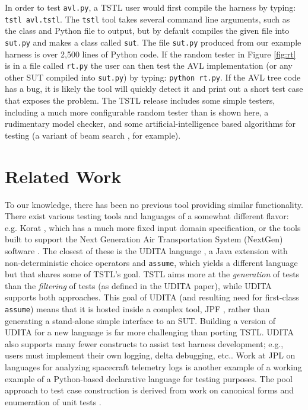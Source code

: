 \documentclass{sig-alternate}
\begin{document}
In order to test {\tt avl.py},  a TSTL user would first compile the
harness by typing: {\tt tstl avl.tstl}.
The {\tt tstl} tool takes several command line arguments, such as the
class and Python file to output, but by default compiles the given
file into {\tt sut.py} and makes a class called {\tt sut}.  The file
{\tt sut.py} produced from our example harness is over 2,500 lines of
Python code.  If the random tester in Figure \ref{fig:rt} is in a file called
{\tt rt.py} the user can then test the AVL implementation (or any
other SUT compiled into {\tt sut.py}) by typing:
{\tt python rt.py}.
If the AVL tree code has a bug, it is likely the tool will quickly
detect it and print out a short test case that exposes the problem.
The TSTL release includes some simple testers, including a much more
configurable random tester than is shown here, a rudimentary model
checker, and some artificial-intelligence based algorithms for testing
(a variant of beam search \cite{NFM15}, for example).

\section{Related Work}


To our knowledge, there has been no previous tool providing similar
functionality.  
There exist various testing tools and languages of a somewhat
different flavor: e.g. Korat \cite{Korat}, which has a much more fixed
input domain specification, or the tools built to support the Next
Generation Air Transportation System (NextGen) software
\cite{TameInputs}.  The closest of these is the UDITA language
\cite{UDITA}, a Java extension with non-deterministic choice
operators and {\tt assume}, which yields a different language but
that shares some of TSTL's goal.  TSTL aims more at the \emph{generation} of
tests than the \emph{filtering} of tests (as defined in the UDITA
paper), while UDITA supports both approaches.  This goal of UDITA (and
resulting need for first-class {\tt assume}) means that it is hosted
inside a complex tool, JPF
\cite{JPF2}, rather than generating a stand-alone simple interface to
an SUT.  Building a version of UDITA for a new language is
far more challenging than porting TSTL.  UDITA also supports many fewer
constructs to assist test harness development; e.g., users must
implement their own logging, delta debugging, etc..
Work at JPL on languages for analyzing spacecraft telemetry
logs \cite{scriptstospecs} is another example of a working example of a
Python-based declarative language for testing purposes.  The pool
approach to test case construction is derived from work on canonical
forms and enumeration of unit tests \cite{AndrewsTR}.
\end{document}
